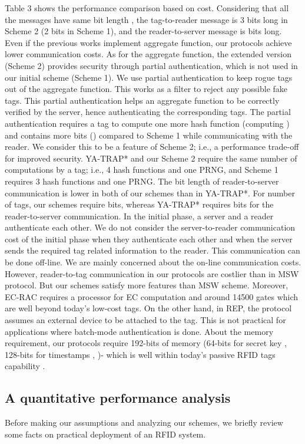 \documentclass{easychair}
\begin{document}
Table 3 shows the performance comparison based on cost. Considering that all the messages have same bit length , 
the tag-to-reader message is 3 bits long in Scheme 2 (2 bits in Scheme 1), and the reader-to-server message is  
bits long. Even if the previous works implement
aggregate function, our protocols achieve lower communication costs. As for the aggregate function, the extended version (Scheme 2) provides security through partial authentication, 
which is not used in our initial scheme (Scheme 1). We use partial 
authentication to keep rogue tags out of the aggregate function. This works as a filter to reject any possible fake 
tags. This partial authentication helps an aggregate function to be correctly 
verified by the server, hence authenticating the corresponding tags. The 
partial authentication requires a tag to compute one more hash function 
(computing ) and contains  more bits () compared to Scheme 1 while 
communicating with the reader. We consider this to be a 
feature of Scheme 2; i.e., a performance trade-off for improved security. YA-TRAP* and our Scheme 2 require the same number of computations by a tag; i.e., 
4 hash functions and one PRNG, and Scheme 1 requires 3 hash functions and one PRNG. The bit length of reader-to-server communication is 
lower in both of our schemes than in YA-TRAP*. For  number of tags, our schemes 
require  bits, whereas YA-TRAP* requires  bits for the reader-to-server communication. In the initial
 phase, a server and a reader authenticate each other. We do not consider the server-to-reader communication cost of 
 the initial phase when they authenticate each other and when the server sends the required tag related information to the 
 reader. This communication can be done off-line. We are mainly concerned about the on-line communication costs. 
 However, reader-to-tag communication in our protocols are costlier than in MSW protocol. But our schemes
  satisfy more features than MSW scheme. Moreover, EC-RAC requires a processor for EC computation 
  and around 14500 gates which are well beyond today's low-cost tags. On the other hand, in REP, the protocol assumes an external device to be 
attached to the tag. This is not practical for applications where batch-mode 
authentication is done. About the memory requirement, our protocols require 192-bits of memory (64-bits for secret
 key , 128-bits for timestamps , )- which is well within today's passive RFID 
 tags capability \cite{memory}.




\subsection{A quantitative performance analysis}
Before making our assumptions and analyzing our schemes, we briefly review some facts on practical deployment of an RFID system.
\end{document}
